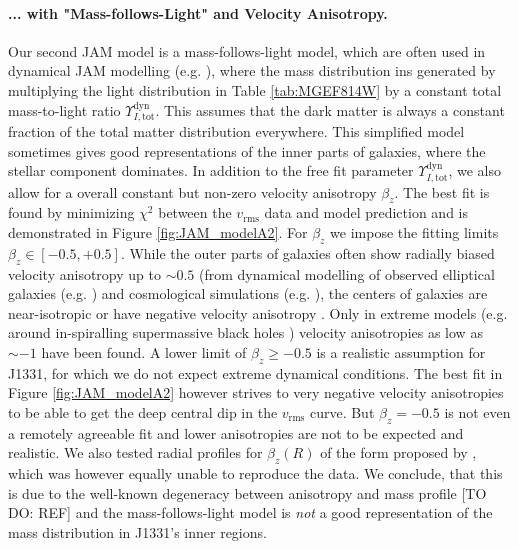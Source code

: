 \paragraph{... with "Mass-follows-Light" and Velocity Anisotropy.} Our second JAM model is a mass-follows-light model, which are often used in dynamical JAM modelling (e.g. \citet{GlennEC,Cap06}), where the mass distribution ins generated by multiplying the light distribution in Table \ref{tab:MGEF814W} by a constant total mass-to-light ratio  $\Upsilon_{I,\text{tot}}^\text{dyn}$. This assumes that the dark matter is always a constant fraction of the total matter distribution everywhere. This simplified model sometimes gives good representations of the inner parts of galaxies, where the stellar component dominates. In addition to the free fit parameter  $\Upsilon_{I,\text{tot}}^\text{dyn}$, we also allow for a overall constant but non-zero velocity anisotropy $\beta_z$. The best fit is found by minimizing $\chi^2$ between the $v_\text{rms}$ data and model prediction and is demonstrated in Figure \ref{fig:JAM_modelA2}. For $\beta_z$ we impose the fitting limits $\beta_z \in [-0.5,+0.5]$. While the outer parts of galaxies often show radially biased velocity anisotropy up to $\sim 0.5$ (from dynamical modelling of observed elliptical galaxies (e.g. \citet{Kronawitter2000}) and cosmological simulations (e.g. \citet{2004MNRAS.352..535D,2001ApJ...557..533F}), the centers of galaxies are near-isotropic or have  negative velocity anisotropy \citep{2003ApJ...583...92G}. Only in extreme models (e.g. around in-spiralling supermassive black holes \citep{1997NewA....2..533Q}) velocity anisotropies as low as $\sim -1$ have been found. A lower limit of $\beta_z \geq -0.5$ is a realistic assumption for J1331, for which we do not expect extreme dynamical conditions. The best fit in Figure \ref{fig:JAM_modelA2} however strives to very negative velocity anisotropies to be able to get the deep central dip in the  $v_\text{rms}$ curve. But $\beta_z = -0.5$ is not even a remotely agreeable fit and lower anisotropies are not to be expected and realistic. We also tested radial profiles for $\beta_z(R)$ of the form proposed by \citet{BaesVanHese}, which was however equally unable to reproduce the data. We conclude, that this is due to the well-known degeneracy between anisotropy and mass profile [TO DO: REF] and the mass-follows-light model is \emph{not} a good representation of the mass distribution in J1331's inner regions.



